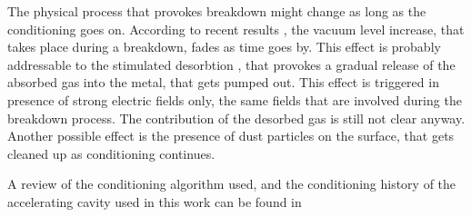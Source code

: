 The physical process that provokes breakdown might change as long as the conditioning goes on. According to recent results \cite{Wuensch:583549}, the vacuum level increase, that takes place during a breakdown, fades as time goes by. This effect is probably addressable to the stimulated desorbtion \cite{soviet:1983}, that provokes a gradual release of the absorbed gas into the metal, that gets pumped out. This effect is triggered in presence of strong electric fields only, the same fields that are involved during the breakdown process. The contribution of the desorbed gas is still not clear anyway. Another possible effect is the presence of dust particles on the surface, that gets cleaned up as conditioning continues.

A review of the conditioning algorithm used, and the conditioning history of the accelerating cavity used in this work can be found in \cite{Degiovanni:1742280}










